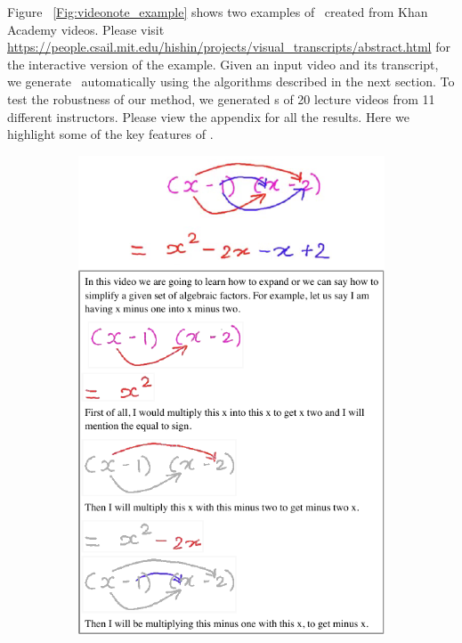 Figure ~\ref{Fig:videonote_example} shows two examples of \systemname\ created from Khan Academy videos. Please visit \url{https://people.csail.mit.edu/hishin/projects/visual_transcripts/abstract.html} for the interactive version of the example. Given an input video and its transcript, we generate \systemname\ automatically using the algorithms described in the next section. To test the robustness of our method, we generated \systemname s of 20 lecture videos from 11 different instructors. Please view the appendix for all the results. Here we highlight some of the key features of \systemname .\\
%
\begin{figure}[t!]
    \centering
    \begin{subfigure}[t]{2.4in}
        \centering
        \includegraphics[width=\textwidth]{figures/progression_ex.pdf}

\end{subfigure}
\end{figure}
